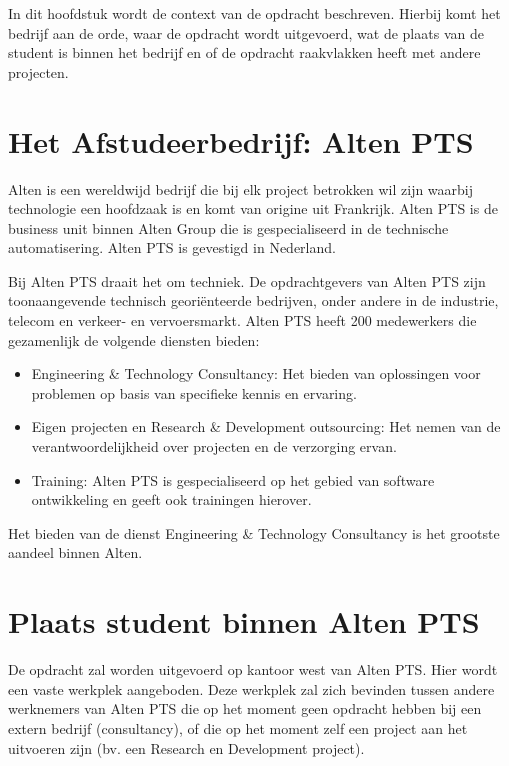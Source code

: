 \documentclass{../local}
\begin{document}
In dit hoofdstuk wordt de context van de opdracht beschreven. Hierbij komt het bedrijf aan de orde, waar de opdracht wordt uitgevoerd, wat de plaats van de student is binnen het bedrijf en of de opdracht raakvlakken heeft met andere projecten. 

\section{Het Afstudeerbedrijf: Alten PTS}
Alten is een wereldwijd bedrijf die bij elk project betrokken wil zijn waarbij technologie een hoofdzaak is en komt van origine uit Frankrijk. Alten PTS is de business unit binnen Alten Group die is gespecialiseerd in de technische automatisering. Alten PTS is gevestigd in Nederland.

Bij Alten PTS draait het om techniek. De opdrachtgevers van Alten PTS zijn toonaangevende technisch georiënteerde bedrijven, onder andere in de industrie, telecom en verkeer- en vervoersmarkt. Alten PTS heeft 200 medewerkers die gezamenlijk de volgende diensten bieden:

\begin{itemize}

\item Engineering \& Technology Consultancy: Het bieden van oplossingen voor problemen op basis van specifieke kennis en ervaring.
\item Eigen projecten en Research \& Development outsourcing: Het nemen van de verantwoordelijkheid over projecten en de verzorging ervan.
\item Training: Alten PTS is gespecialiseerd op het gebied van software ontwikkeling en geeft ook trainingen hierover.

\end{itemize}

Het bieden van de dienst Engineering \& Technology Consultancy is het grootste aandeel binnen Alten.\cite{Alten}

\section{Plaats student binnen Alten PTS}
De opdracht zal worden uitgevoerd op kantoor west van Alten PTS. Hier wordt een vaste werkplek aangeboden. Deze werkplek zal zich bevinden tussen andere werknemers van Alten PTS die op het moment geen opdracht hebben bij een extern bedrijf (consultancy), of die op het moment zelf een project aan het uitvoeren zijn (bv. een Research en Development project).
\end{document}
